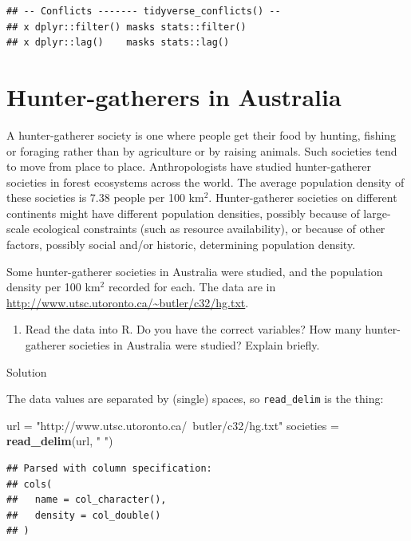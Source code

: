 \documentclass[]{tufte-book}
\newenvironment{Shaded}{}{}
\newcommand{\KeywordTok}[1]{\textcolor[rgb]{0.00,0.44,0.13}{\textbf{#1}}}
\newcommand{\NormalTok}[1]{#1}
\newcommand{\StringTok}[1]{\textcolor[rgb]{0.25,0.44,0.63}{#1}}
\providecommand{\tightlist}{%
  \setlength{\itemsep}{0pt}\setlength{\parskip}{0pt}}
\theoremstyle{definition}
\theoremstyle{definition}
\theoremstyle{definition}
\theoremstyle{remark}
\begin{document}
\begin{verbatim}
## -- Conflicts ------- tidyverse_conflicts() --
## x dplyr::filter() masks stats::filter()
## x dplyr::lag()    masks stats::lag()
\end{verbatim}

\hypertarget{hunter-gatherers-in-australia}{%
\section{Hunter-gatherers in
Australia}\label{hunter-gatherers-in-australia}}

A hunter-gatherer society is one where people get their food by hunting,
fishing or foraging rather than by agriculture or by raising animals.
Such societies tend to move from place to place. Anthropologists have
studied hunter-gatherer societies in forest ecosystems across the world.
The average population density of these societies is 7.38 people per 100
km\(^2\). Hunter-gatherer societies on different continents might have
different population densities, possibly because of large-scale
ecological constraints (such as resource availability), or because of
other factors, possibly social and/or historic, determining population
density.

Some hunter-gatherer societies in Australia were studied, and the
population density per 100 km\(^2\) recorded for each. The data are in
\url{http://www.utsc.utoronto.ca/~butler/c32/hg.txt}.

\begin{enumerate}
\def\labelenumi{(\alph{enumi})}
\tightlist
\item
  Read the data into R. Do you have the correct variables? How many
  hunter-gatherer societies in Australia were studied? Explain briefly.
\end{enumerate}

Solution

The data values are separated by (single) spaces, so
\texttt{read\_delim} is the thing:

\begin{Shaded}
\begin{Highlighting}[]
\NormalTok{url =}\StringTok{ "http://www.utsc.utoronto.ca/~butler/c32/hg.txt"}
\NormalTok{societies =}\StringTok{ }\KeywordTok{read_delim}\NormalTok{(url, }\StringTok{" "}\NormalTok{)}
\end{Highlighting}
\end{Shaded}

\begin{verbatim}
## Parsed with column specification:
## cols(
##   name = col_character(),
##   density = col_double()
## )
\end{verbatim}
\end{document}
